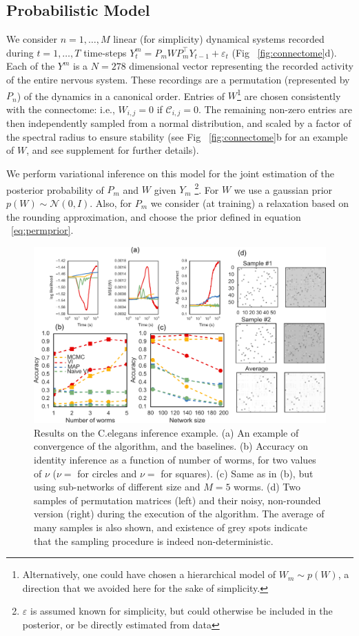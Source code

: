 \documentclass[twoside]{article}
\begin{document}
\subsection{Probabilistic Model}
We consider $n=1,\ldots, M$ linear (for simplicity) dynamical systems recorded during $t=1,\ldots, T$ time-steps $Y^m_t=P_mWP_m^\top Y_{t-1}+\varepsilon_t$ (Fig ~\ref{fig:connectome}d). Each of the $Y^m$ is a $N=278$ dimensional vector representing the recorded activity of the entire nervous system. These recordings are a permutation (represented by $P_n$) of the dynamics in a canonical order.  Entries of $W$\footnote{Alternatively, one could have chosen a hierarchical model of $W_m\sim p(W)$, a direction that we avoided here for the sake of simplicity.} are chosen consistently with the connectome: i.e., $W_{i,j}=0$ if $\mathcal{C}_{i,j}=0$. The remaining non-zero entries are then independently sampled from a normal distribution, and scaled by a factor of the spectral radius to ensure stability (see Fig ~\ref{fig:connectome}b for an example of $W$, and see supplement for further details).

We perform variational inference on this model for the joint estimation of the posterior probability of $P_m$ and $W$ given  $Y_m$ \footnote{$\varepsilon$ is assumed known for simplicity, but could otherwise be included in the posterior, or be directly estimated from data}. For $W$ we use a gaussian prior $p(W)\sim \mathcal{N}(0, I)$. Also, for $P_m$ we consider (at training) a relaxation based on the rounding approximation, and choose the prior defined in equation ~\ref{eq:permprior}. 

\begin{figure}[ht]
  \centering
  \includegraphics[width=1.0\textwidth]{../figures/figure7.pdf} 
  \caption{Results on the C.elegans inference example. (a) An example of convergence of the algorithm, and the baselines. (b) Accuracy on identity inference as a function of number of worms, for two values of $\nu$ ($\nu=$ for circles and $\nu=$ for squares). (c) Same as in (b), but using sub-networks of different size and $M=5$ worms. (d) Two samples of permutation matrices (left) and their noisy, non-rounded version (right) during the execution of the algorithm. The average of many samples is also shown, and existence of grey spots indicate that the sampling procedure is indeed non-deterministic.}
\label{fig:elegantresults}
\end{figure}
\end{document}
